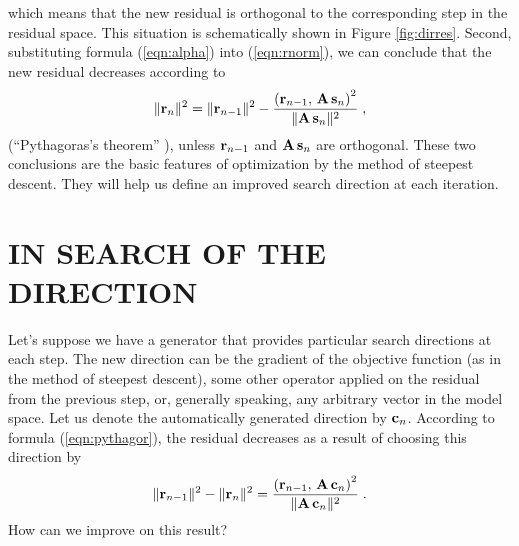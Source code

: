 which means that the new residual is orthogonal to the corresponding
step in the residual space. This situation is schematically shown in
Figure \ref{fig:dirres}. Second, substituting formula (\ref{eqn:alpha}) into 
(\ref{eqn:rnorm}), we can conclude that the new residual decreases according
to
\begin{equation}
\|{\bf r}_n\|^2 = \|{\bf r}_{n-1}\|^2 - 
{{\left({\bf r}_{n-1},\,{\bf A\,s}_n\right)^2} \over
{\|{\bf A\,s}_n\|^2}}\;,
\label{eqn:pythagor}
\end{equation}
(``Pythagoras's theorem'' ), unless ${\bf r}_{n-1}$ and ${\bf A\,s}_n$
are orthogonal. These two conclusions are the basic features of
optimization by the method of steepest descent. They will help us
define an improved search direction at each iteration.



\section{IN SEARCH OF THE DIRECTION} 
Let's sup\-pose we have a ge\-ne\-ra\-tor that pro\-vides
parti\-cu\-lar search directions at each step. The new direction can
be the gradient of the objective function (as in the method of
steepest descent), some other operator applied on the residual from
the previous step, or, generally speaking, any arbitrary vector in the
model space. Let us denote the automatically generated direction by
${\bf c}_n$. According to formula (\ref{eqn:pythagor}), the residual
decreases as a result of choosing this direction by
\begin{equation}
\|{\bf r}_{n-1}\|^2 - \|{\bf r}_{n}\|^2 = 
{{\left({\bf r}_{n-1},\,{\bf A\,c}_n\right)^2} \over {\|{\bf
A\,c}_n\|^2}}\;.
\label{eqn:deltar}
\end{equation}
How can we improve on this result? 

